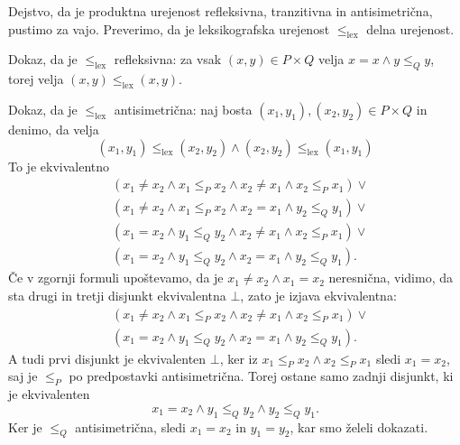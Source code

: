 \begin{dokaz}
  Dejstvo, da je produktna urejenost refleksivna, tranzitivna in antisimetrična, pustimo za vajo. Preverimo, da je leksikografska urejenost $\leq_\mathrm{lex}$ delna urejenost.

  Dokaz, da je $\leq_\mathrm{lex}$ refleksivna: za vsak $(x, y) \in P \times Q$ velja $x = x \land y \leq_Q y$, torej velja $(x, y) \leq_\mathrm{lex} (x, y)$.

  Dokaz, da je $\leq_\mathrm{lex}$ antisimetrična: naj bosta $(x_1,y_1), (x_2,y_2) \in P \times Q$ in denimo, da velja
  \begin{equation*}
    (x_1, y_1) \leq_\mathrm{lex} (x_2, y_2) \land (x_2, y_2) \leq_\mathrm{lex} (x_1, y_1)
  \end{equation*}
  To je ekvivalentno
  \begin{align*}
  & (x_1 \neq x_2 \land x_1 \leq_P x_2 \land x_2 \neq x_1 \land x_2 \leq_P x_1) \lor {}\\
  & (x_1 \neq x_2 \land x_1 \leq_P x_2 \land x_2 = x_1 \land y_2 \leq_Q y_1) \lor {}\\
  & (x_1 = x_2 \land y_1 \leq_Q y_2 \land x_2 \neq x_1 \land x_2 \leq_P x_1) \lor {}\\
  & (x_1 = x_2 \land y_1 \leq_Q y_2 \land x_2 = x_1 \land y_2 \leq_Q y_1).
  \end{align*}
  Če v zgornji formuli upoštevamo, da je $x_1 \neq x_2 \land x_1 = x_2$ neresnična, vidimo, da sta drugi in tretji disjunkt ekvivalentna $\bot$, zato
  je izjava ekvivalentna:
  \begin{align*}
  &(x_1 \neq x_2 \land x_1 \leq_P x_2 \land x_2 \neq x_1 \land x_2 \leq_P x_1) \lor {}\\
  &(x_1 = x_2 \land y_1 \leq_Q y_2 \land x_2 = x_1 \land y_2 \leq_Q y_1).
  \end{align*}
  A tudi prvi disjunkt je ekvivalenten $\bot$, ker iz $x_1 \leq_P x_2 \land x_2 \leq_P x_1$ sledi $x_1 = x_2$, saj je $\leq_P$ po predpostavki antisimetrična. Torej ostane samo zadnji disjunkt, ki je ekvivalenten
  \begin{equation*}
    x_1 = x_2 \land y_1 \leq_Q y_2 \land y_2 \leq_Q y_1.
  \end{equation*}
  Ker je $\leq_Q$ antisimetrična, sledi $x_1 = x_2$ in $y_1 = y_2$, kar smo želeli dokazati.


\end{dokaz}
